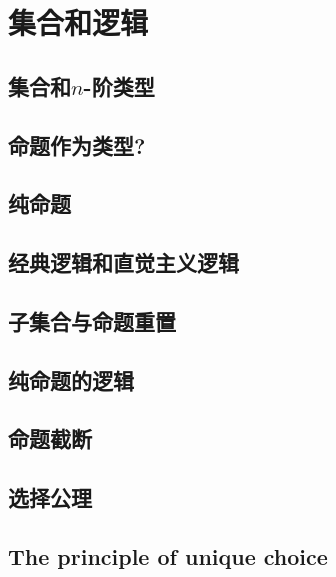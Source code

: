 \chapter{集合和逻辑}
\label{cha:logic}


\section{集合和\texorpdfstring{$n$}{n}-阶类型}
\label{sec:basics-sets}


\section{命题作为类型?}
\label{subsec:pat?}


\section{纯命题}
\label{subsec:hprops}


\section{经典逻辑和直觉主义逻辑}
\label{sec:intuitionism}


\section{子集合与命题重置}
\label{subsec:prop-subsets}


\section{纯命题的逻辑}
\label{subsec:logic-hprop}


\section{命题截断}
\label{subsec:prop-trunc}


\section{选择公理}
\label{sec:axiom-choice}


\section{The principle of unique choice}
\label{sec:unique-choice}


